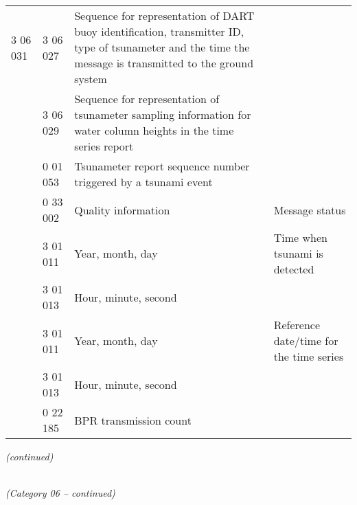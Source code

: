 \begin{longtable}[]{@{}llll@{}}
3 06 031 & 3 06 027 & Sequence for representation of DART buoy identification, transmitter ID, type of tsunameter and the time the message is transmitted to the ground system &\tabularnewline
& 3 06 029 & Sequence for representation of tsunameter sampling information for water column heights in the time series report &\tabularnewline
& 0 01 053 & Tsunameter report sequence number triggered by a tsunami event &\tabularnewline
& 0 33 002 & Quality information & Message status\tabularnewline
& 3 01 011 & Year, month, day & Time when tsunami is detected\tabularnewline
& 3 01 013 & Hour, minute, second &\tabularnewline
& 3 01 011 & Year, month, day & Reference date/time for the time series\tabularnewline
& 3 01 013 & Hour, minute, second &\tabularnewline
& 0 22 185 & BPR transmission count &\tabularnewline
\bottomrule
\end{longtable}

\emph{(continued)}

\emph{\\
(Category 06 -- continued)}

